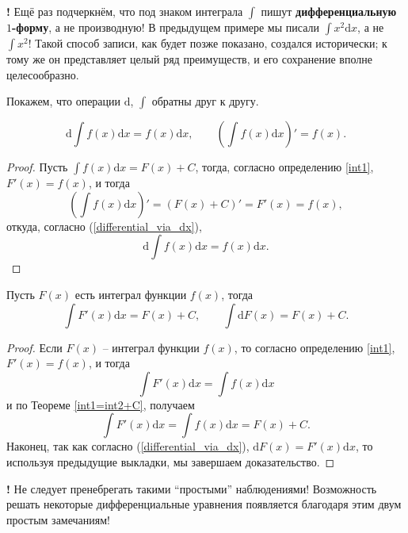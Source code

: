    
\begin{mydanger}{\bf{!}}
    Ещё раз подчеркнём, что под знаком интеграла $\int$ пишут \textbf{дифференциальную $1$-форму}, а не производную! В предыдущем примере мы писали $\int x^2 \mathrm{d}x$, а не $\int x^2$! Такой способ записи, как будет позже показано, создался исторически; к тому же он представляет целый ряд преимуществ, и его сохранение вполне целесообразно. 
\end{mydanger}



Покажем, что операции $\mathrm{d}$, $\int$ обратны друг к другу.

\begin{lemma}
    \[
     \mathrm{d} \int f(x)\mathrm{d}x = f(x) \mathrm{d}x, \qquad \left( \int f(x) \mathrm{d}x \right)' = f(x).
    \]
\end{lemma}

\begin{proof}
    Пусть $\int f(x) \mathrm{d}x = F(x)+C$, тогда, согласно определению \ref{int1}, $F'(x) = f(x)$, и тогда
    \[
    \left(\int f(x) \mathrm{d}x \right)' =  (F(x) + C)' = F'(x)  = f(x), 
    \]
откуда, согласно (\ref{differential_via_dx}),
\[
 \mathrm{d} \int f(x)\mathrm{d}x = f(x) \mathrm{d}x.
\]
\end{proof}

\begin{lemma}\label{intdF=F}
    Пусть $F(x)$ есть интеграл функции $f(x)$, тогда
    \[
     \int F'(x) \mathrm{d}x = F(x) +C, \qquad \int \mathrm{d}F(x) = F(x) + C.
    \]
\end{lemma}
\begin{proof}
    Если $F(x)$ -- интеграл функции $f(x)$, то согласно определению \ref{int1}, $F'(x) = f(x)$, и тогда
    \[
      \int F'(x) \mathrm{d}x = \int f(x) \mathrm{d}x
    \]
    и по Теореме \ref{int1=int2+C}, получаем
    \[
      \int F'(x) \mathrm{d}x = \int f(x) \mathrm{d}x =  F(x) +C.
    \]
Наконец, так как согласно (\ref{differential_via_dx}), $\mathrm{d}F(x)  = F'(x) \mathrm{d}x$, то используя предыдущие выкладки, мы завершаем доказательство.
\end{proof}

\begin{mydanger}{\bf{!}}
    Не следует пренебрегать такими ``простыми'' наблюдениями! Возможность решать некоторые дифференциальные уравнения появляется благодаря этим двум простым замечаниям! 
\end{mydanger}

